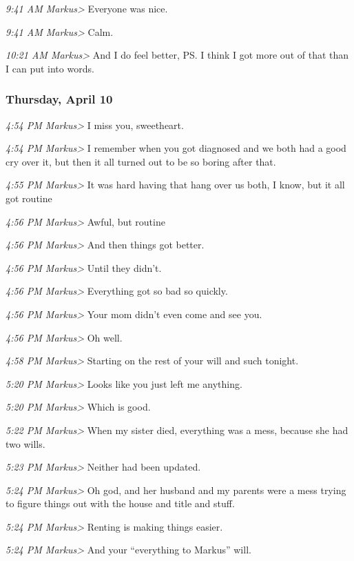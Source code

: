 {\emph{9:41 AM Markus\textgreater{}} Everyone was nice.

\emph{9:41 AM Markus\textgreater{}} Calm.

\emph{10:21 AM Markus\textgreater{}} And I do feel better, PS. I think I
got more out of that than I can put into words.

\subsubsection*{Thursday, April 10}\label{thursday-april-10}

\emph{4:54 PM Markus\textgreater{}} I miss you, sweetheart.

\emph{4:54 PM Markus\textgreater{}} I remember when you got diagnosed
and we both had a good cry over it, but then it all turned out to be so
boring after that.

\emph{4:55 PM Markus\textgreater{}} It was hard having that hang over us
both, I know, but it all got routine

\emph{4:56 PM Markus\textgreater{}} Awful, but routine

\emph{4:56 PM Markus\textgreater{}} And then things got better.

\emph{4:56 PM Markus\textgreater{}} Until they didn't.

\emph{4:56 PM Markus\textgreater{}} Everything got so bad so quickly.

\emph{4:56 PM Markus\textgreater{}} Your mom didn't even come and see
you.

\emph{4:56 PM Markus\textgreater{}} Oh well.

\emph{4:58 PM Markus\textgreater{}} Starting on the rest of your will
and such tonight.

\emph{5:20 PM Markus\textgreater{}} Looks like you just left me
anything.

\emph{5:20 PM Markus\textgreater{}} Which is good.

\emph{5:22 PM Markus\textgreater{}} When my sister died, everything was
a mess, because she had two wills.

\emph{5:23 PM Markus\textgreater{}} Neither had been updated.

\emph{5:24 PM Markus\textgreater{}} Oh god, and her husband and my
parents were a mess trying to figure things out with the house and title
and stuff.

\emph{5:24 PM Markus\textgreater{}} Renting is making things easier.

\emph{5:24 PM Markus\textgreater{}} And your ``everything to Markus''
will.

}
